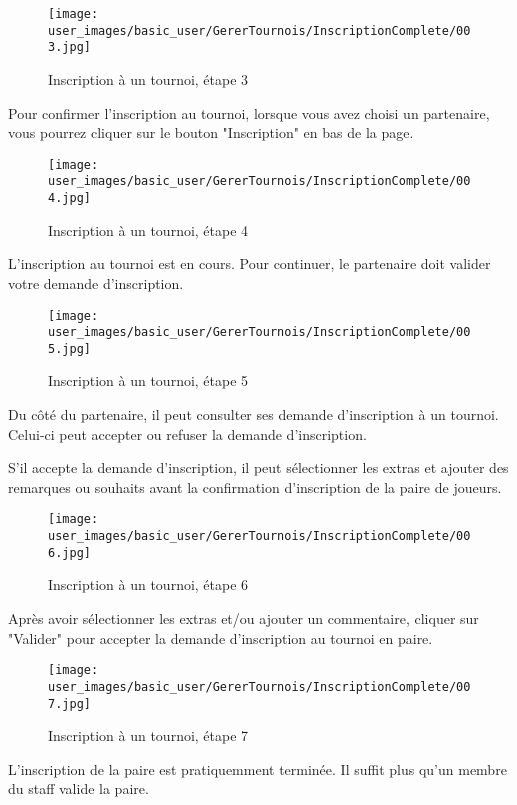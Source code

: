 \begin{figure}[H]
\centering
\texttt{[image: user\_images/basic\_user/GererTournois/InscriptionComplete/003.jpg]}
\caption{Inscription à un tournoi, étape 3}
\end{figure}

Pour confirmer l'inscription au tournoi, lorsque vous avez choisi un partenaire, vous pourrez cliquer sur le bouton "Inscription" en bas de la page.

\begin{figure}[H]
\centering
\texttt{[image: user\_images/basic\_user/GererTournois/InscriptionComplete/004.jpg]}
\caption{Inscription à un tournoi, étape 4}
\end{figure}

L'inscription au tournoi est en cours. Pour continuer, le partenaire doit valider votre demande d'inscription.

\begin{figure}[H]
\centering
\texttt{[image: user\_images/basic\_user/GererTournois/InscriptionComplete/005.jpg]}
\caption{Inscription à un tournoi, étape 5}
\end{figure}

Du côté du partenaire, il peut consulter ses demande d'inscription à un tournoi. Celui-ci peut accepter ou refuser la demande d'inscription. \newline

S'il accepte la demande d'inscription, il peut sélectionner les extras et ajouter des remarques ou souhaits avant la confirmation d'inscription de la paire de joueurs.

\begin{figure}[H]
\centering
\texttt{[image: user\_images/basic\_user/GererTournois/InscriptionComplete/006.jpg]}
\caption{Inscription à un tournoi, étape 6}
\end{figure}

Après avoir sélectionner les extras et/ou ajouter un commentaire, cliquer sur "Valider" pour accepter la demande d'inscription au tournoi en paire.

\begin{figure}[H]
\centering
\texttt{[image: user\_images/basic\_user/GererTournois/InscriptionComplete/007.jpg]}
\caption{Inscription à un tournoi, étape 7}
\end{figure}

L'inscription de la paire est pratiquemment terminée. Il suffit plus qu'un membre du staff valide la paire.

